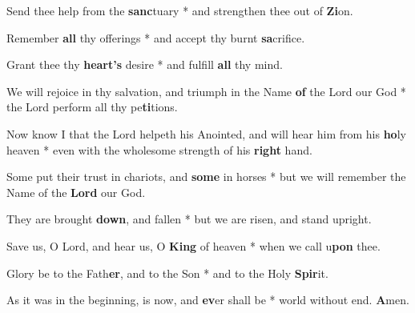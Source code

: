 \begin{multicols}{2}
	Send thee help from the \textbf{sanc}tuary * and strengthen thee out of \textbf{Zi}on.
	
	Remember \textbf{all} thy offerings * and accept thy burnt \textbf{sa}crifice.
	
	Grant thee thy \textbf{heart's} desire * and fulfill \textbf{all} thy mind.
	
	We will rejoice in thy salvation, and triumph in the Name \textbf{of} the Lord our God * the Lord perform all thy pe\textbf{ti}tions.
	
	Now know I that the Lord helpeth his Anointed, and will hear him from his \textbf{ho}ly heaven * even with the wholesome strength of his \textbf{right} hand.
	
	Some put their trust in chariots, and \textbf{some} in horses * but we will remember the Name of the \textbf{Lord} our God.
	
	They are brought \textbf{down}, and fallen * but we are risen, and s\textbf{}tand upright.
	
	Save us, O Lord, and hear us, O \textbf{King} of heaven * when we call u\textbf{pon} thee.
	
	Glory be to the Fath\textbf{er}, and to the Son * and to the Holy \textbf{Spir}it.
	
	As it was in the beginning, is now, and \textbf{ev}er shall be * world without end. \textbf{A}men.
\end{multicols}